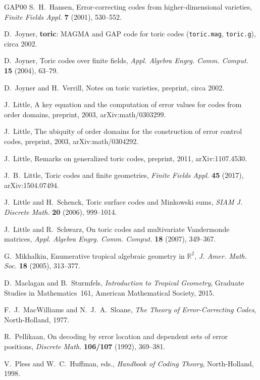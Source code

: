 \documentclass[12pt,letterpaper]{article}
\numberwithin{equation}{section}
\theoremstyle{definition}
\theoremstyle{remark}
\newcommand{\R}{\mathbb{R}}
\begin{document}
\begin{thebibliography}{GAP00}
S.~H.~Hansen, Error-correcting codes from higher-dimensional varieties,
\emph{Finite Fields Appl.} \textbf{7} (2001), 530--552.

D.~Joyner, \textbf{toric}: MAGMA and GAP code for toric codes
(\texttt{toric.mag}, \texttt{toric.g}), circa 2002.

D.~Joyner, Toric codes over finite fields, \emph{Appl. Algebra Engrg. Comm.
Comput.} \textbf{15} (2004), 63--79.

D.~Joyner and H.~Verrill, Notes on toric varieties, preprint, circa 2002.

J.~Little, A key equation and the computation of error values for codes from
order domains, preprint, 2003, arXiv:math/0303299.

J.~Little, The ubiquity of order domains for the construction of error
control codes, preprint, 2003, arXiv:math/0304292.

J.~Little, Remarks on generalized toric codes, preprint, 2011,
arXiv:1107.4530.

J.~B.~Little, Toric codes and finite geometries, \emph{Finite Fields Appl.}
\textbf{45} (2017), arXiv:1504.07494.

J.~Little and H.~Schenck, Toric surface codes and Minkowski sums, \emph{SIAM
J. Discrete Math.} \textbf{20} (2006), 999--1014.

J.~Little and R.~Schwarz, On toric codes and multivariate Vandermonde
matrices, \emph{Appl. Algebra Engrg. Comm. Comput.} \textbf{18} (2007),
349--367.

G.~Mikhalkin, Enumerative tropical algebraic geometry in $\R^2$, \emph{J.
Amer. Math. Soc.} \textbf{18} (2005), 313--377.

D.~Maclagan and B.~Sturmfels, \emph{Introduction to Tropical Geometry},
Graduate Studies in Mathematics~161, American Mathematical Society, 2015.

F.~J.~MacWilliams and N.~J.~A.~Sloane, \emph{The Theory of Error-Correcting
Codes}, North-Holland, 1977.

R.~Pellikaan, On decoding by error location and dependent sets of error
positions, \emph{Discrete Math.} \textbf{106/107} (1992), 369--381.

V.~Pless and W.~C.~Huffman, eds., \emph{Handbook of Coding Theory},
North-Holland, 1998.


\end{thebibliography}
\end{document}
